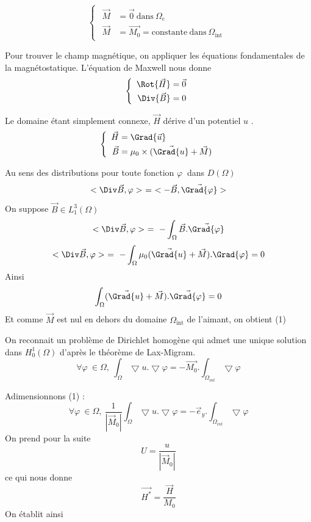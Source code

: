 \documentclass[a4paper,12pt,titlepage]{report}
\begin{document}
\begin{onehalfspace}
\[ 
\left\{
\begin{array}{ccc}
\begin{aligned}
	\vec{M} &= \vec{0} \  \text{dans} \ \Omega_{e} \\ 
	\vec{M} &= \vec{M_{0}} = \text{constante}  \ \text{dans}  \  \Omega_{\text{int}}
\end{aligned}
\end{array}
\right.
\]

Pour trouver le champ magnétique, on appliquer les équations fondamentales de la magnétostatique. L'équation de Maxwell nous donne 
\[
	\left\{
	\begin{array}{ccc}
	\begin{aligned}
		\Rot{\vec{H}} &= \vec {0} \\
		\Div{\vec{B}} &= 0
	\end{aligned}
	\end{array}
	\right.
\]

Le domaine étant simplement connexe, $\vec{H}$ dérive d'un potentiel $u$	.
\[
	\left\{
	\begin{array}{ccc}		
	\begin{aligned}
		\vec{H} &= \Grad{\vec{u}} \\
		\vec{B} &= \mu_{0}\times(\vec{\Grad{u}}+\vec{M})
	\end{aligned}
	\end{array}
	\right.
\]

Au sens des distributions pour toute fonction $\varphi\ $  dans $D(\Omega)$	
\[<\Div\vec{B},\varphi> \ = \ <-\vec{B},\vec{\Grad{\varphi}}>\]
On suppose $\vec{B} \in L^{3}_{1}(\Omega)$
\[<\Div\vec{B},\varphi> \ = \  -\int_{\Omega}\vec{B}. \vec{\Grad{\varphi}}\]
\[<\Div\vec{B},\varphi> \ = \ -\int_{\Omega}\mu_{0}(\vec{\Grad{u}}+\vec{M}) .{\Grad{\varphi}} = 0\]
Ainsi
\[\int_{\Omega}(\vec{\Grad{u}}+\vec{M}) . \vec{\Grad{\varphi}} = 0\]
Et comme $\vec{M}$ est nul en dehors du domaine $\Omega_{\text{int}}$ de l'aimant, on obtient (1)

On reconnait un problème de Dirichlet homogène qui admet une unique solution dans $H_{0}^{1}(\Omega)$ d'après le théorème de Lax-Migram.
\begin{equation}
\label{E}
\forall \varphi\ \in \Omega, \ \int_{\Omega}\bigtriangledown u .\bigtriangledown{\varphi} = -\vec{M_{0}}. \int_{\Omega_{int}}\bigtriangledown\varphi
\end{equation}

Adimensionnons (1)				:
\[
	\forall \varphi\  \in \Omega,\  \frac{1}{|\vec{M}_{0}|}\int_{\Omega}\bigtriangledown u.\bigtriangledown \varphi
	= -\vec{e}_{y}.\int_{\Omega_{int}}\bigtriangledown \varphi
\]
On prend pour la suite \[U =  \frac{u}{|\vec{M}_{0}|}  \] ce qui nous donne \[\vec{H^*} =\frac{\vec{H}}{M_0} \]
On établit ainsi \label{A}


\end{onehalfspace}
\end{document}
